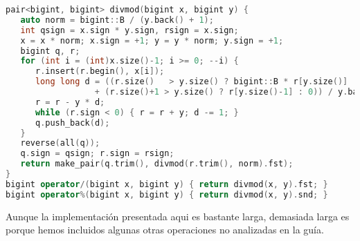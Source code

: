 \begin{lstlisting}[language=C++]
pair<bigint, bigint> divmod(bigint x, bigint y) {
   auto norm = bigint::B / (y.back() + 1);
   int qsign = x.sign * y.sign, rsign = x.sign;
   x = x * norm; x.sign = +1; y = y * norm; y.sign = +1;
   bigint q, r;
   for (int i = (int)x.size()-1; i >= 0; --i) {
      r.insert(r.begin(), x[i]);
      long long d = ((r.size()   > y.size() ? bigint::B * r[y.size()] : 0) 
                  + (r.size()+1 > y.size() ? r[y.size()-1] : 0)) / y.back();
      r = r - y * d;
      while (r.sign < 0) { r = r + y; d -= 1; }
      q.push_back(d);
   }
   reverse(all(q));
   q.sign = qsign; r.sign = rsign;
   return make_pair(q.trim(), divmod(r.trim(), norm).fst);
}
bigint operator/(bigint x, bigint y) { return divmod(x, y).fst; }
bigint operator%(bigint x, bigint y) { return divmod(x, y).snd; }
\end{lstlisting}

Aunque la implementación presentada aqui es bastante larga, demasiada larga es porque hemos incluidos algunas otras operaciones no analizadas en la guía.
